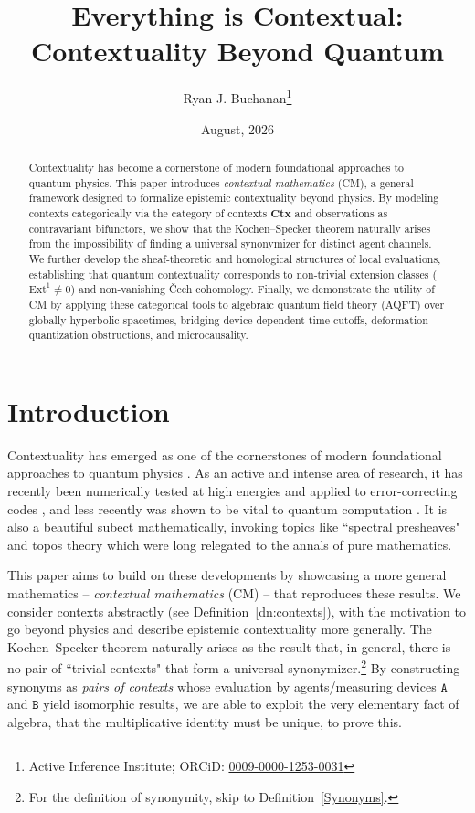 \documentclass{article}
\title{Everything is Contextual: \\ Contextuality Beyond Quantum}
\author{Ryan J. Buchanan\footnote{Active Inference Institute; ORCiD: \href{https://orcid.org/
			0009-0000-1253-0031}{	0009-0000-1253-0031}}}
\date{August, 2026}
\numberwithin{tm}{section}
\numberwithin{dn}{section}
\numberwithin{as}{section}
\numberwithin{rk}{section}
\numberwithin{lem}{section}
\numberwithin{ax}{section}
\numberwithin{pp}{section}
\numberwithin{eg}{section}
\numberwithin{war}{section}
\numberwithin{equation}{section}
\numberwithin{prop}{section}
\numberwithin{nt}{section}
\numberwithin{rc}{section}
\def\code#1{\texttt{#1}}
\begin{document}
\maketitle

\begin{abstract}
	Contextuality has become a cornerstone of modern foundational approaches to quantum physics. This paper introduces \emph{contextual mathematics} (CM), a general framework designed to formalize epistemic contextuality beyond physics. By modeling contexts categorically via the category of contexts $\mathbf{Ctx}$ and observations as contravariant bifunctors, we show that the Kochen--Specker theorem naturally arises from the impossibility of finding a universal synonymizer for distinct agent channels. We further develop the sheaf-theoretic and homological structures of local evaluations, establishing that quantum contextuality corresponds to non-trivial extension classes ($\text{Ext}^1 \neq 0$) and non-vanishing Čech cohomology. Finally, we demonstrate the utility of CM by applying these categorical tools to algebraic quantum field theory (AQFT) over globally hyperbolic spacetimes, bridging device-dependent time-cutoffs, deformation quantization obstructions, and microcausality.
\end{abstract}

\tableofcontents

\section{Introduction}
Contextuality has emerged as one of the cornerstones of modern foundational approaches to quantum physics \cite{abramsky, dunne}. As an active and intense area of research, it has recently been numerically tested \cite{Fabbrichesi} at high energies and applied to error-correcting codes \cite{Khu}, and less recently was shown to be vital to quantum computation \cite{Howard}. It is also a beautiful subect mathematically, invoking topics like ``spectral presheaves" \cite{cannon, dunne} and topos theory \cite{cannon} which were long relegated to the annals of pure mathematics.

This paper aims to build on these developments by showcasing a more general mathematics -- \emph{contextual mathematics} (CM) -- that reproduces these results. We consider contexts abstractly (see Definition~\ref{dn:contexts}), with the motivation to go beyond physics and describe epistemic contextuality more generally. The Kochen--Specker theorem naturally arises as the result that, in general, there is no pair of ``trivial contexts" that form a universal synonymizer.\footnote{For the definition of synonymity, skip to Definition~\ref{Synonyms}.} By constructing synonyms as \emph{pairs of contexts} whose evaluation by agents/measuring devices $\code{A}$ and $\code{B}$ yield isomorphic results, we are able to exploit the very elementary fact of algebra, that the multiplicative identity must be unique, to prove this.
\end{document}
